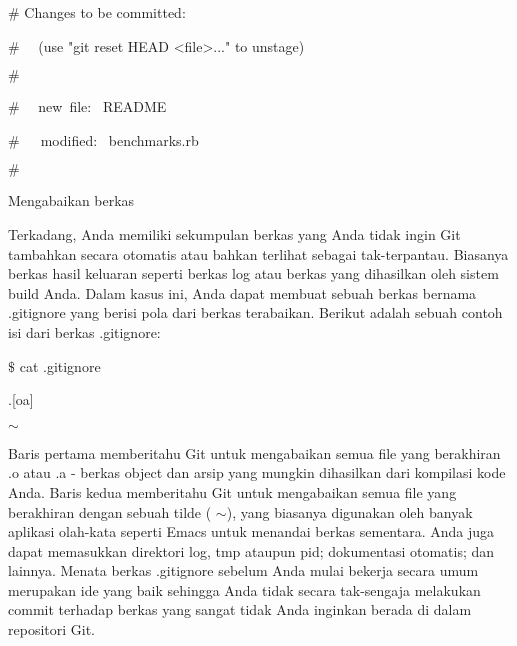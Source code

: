 \noindent 
{\fontsize{14pt}{14pt}\selectfont  $  \#  $ Changes to be committed: \\} \par
\noindent 
{\fontsize{14pt}{14pt}\selectfont  $  \#  $~~ (use "git reset HEAD <file>..." to unstage) \\} \par
\noindent 
{\fontsize{14pt}{14pt}\selectfont  $  \#  $ \\} \par
\noindent 
{\fontsize{14pt}{14pt}\selectfont  $  \#  $~~ new~file:~  README \\} \par
\noindent 
{\fontsize{14pt}{14pt}\selectfont  $  \#  $~~~modified:~  benchmarks.rb \\} \par
\noindent 
{\fontsize{14pt}{14pt}\selectfont  $  \#  $ \\} \par
\vspace{14pt}
\noindent 
{\fontsize{14pt}{14pt}\selectfont Mengabaikan berkas \\} \par
\vspace{14pt}
\noindent 
{\fontsize{14pt}{14pt}\selectfont Terkadang, Anda memiliki sekumpulan berkas yang Anda tidak ingin Git tambahkan secara otomatis atau bahkan terlihat sebagai tak-terpantau. Biasanya berkas hasil keluaran seperti berkas log atau berkas yang dihasilkan oleh sistem build Anda. Dalam kasus ini, Anda dapat membuat sebuah berkas bernama .gitignore yang berisi pola dari berkas terabaikan. Berikut adalah sebuah contoh isi dari berkas .gitignore: \\} \par
\vspace{14pt}
\noindent 
{\fontsize{14pt}{14pt}\selectfont  $  \$  $ cat .gitignore \\} \par
\noindent 
{\fontsize{14pt}{14pt}\selectfont *.[oa] \\} \par
\noindent 
{\fontsize{14pt}{14pt}\selectfont * $  \sim  $ \\} \par
\noindent 
{\fontsize{14pt}{14pt}\selectfont Baris pertama memberitahu Git untuk mengabaikan semua file yang berakhiran .o atau .a - berkas object dan arsip yang mungkin dihasilkan dari kompilasi kode Anda. Baris kedua memberitahu Git untuk mengabaikan semua file yang berakhiran dengan sebuah tilde ( $  \sim  $), yang biasanya digunakan oleh banyak aplikasi olah-kata seperti Emacs untuk menandai berkas sementara. Anda juga dapat memasukkan direktori log, tmp ataupun pid; dokumentasi otomatis; dan lainnya. Menata berkas .gitignore sebelum Anda mulai bekerja secara umum merupakan ide yang baik sehingga Anda tidak secara tak-sengaja melakukan commit terhadap berkas yang sangat tidak Anda inginkan berada di dalam repositori Git. \\} \par
